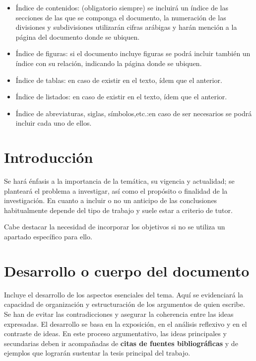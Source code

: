 \begin{itemize}
    \item Índice de contenidos: (obligatorio  siempre)  se  incluirá  un  índice  de  las secciones  de  las  que  se  componga  el  documento,  la  numeración  de las divisiones  y  subdivisiones  utilizarán  cifras  arábigas y harán mención a la página del documento donde se ubiquen.
    
\item Índice de figuras: si el documento incluye figuras se podrá incluir también un índice con su relación, indicando la página donde se ubiquen.

\item Índice de tablas: en caso de existir en el texto, ídem que el anterior.

\item Índice de listados: en caso de existir en el texto, ídem que el anterior.

\item Índice de abreviaturas, siglas, símbolos,etc.:en  caso  de  ser  necesarios  se podrá incluir cada uno de ellos.

\end{itemize}

 \section{Introducción}
Se hará énfasis a la importancia de la temática, su vigencia y  actualidad;  se  planteará  el  problema  a  investigar,  así  como  el  propósito  o finalidad de la investigación. En cuanto a incluir o no un anticipo de las conclusiones habitualmente depende del tipo de trabajo y suele estar a criterio de tutor.

Cabe destacar la necesidad de incorporar los objetivos si no se utiliza un apartado específico para ello.

 \section{Desarrollo o cuerpo del documento}
Incluye   el  desarrollo  de  los  aspectos  esenciales  del  tema.  Aquí  se  evidenciará la capacidad de organización y estructuración de los argumentos de quien escribe. Se han de evitar las contradicciones y asegurar la coherencia entre las ideas expresadas. El desarrollo se  basa  en  la  exposición,  en  el  análisis  reflexivo  y  en  el  contraste  de  ideas.  En  este  proceso  argumentativo,  las  ideas  principales  y  secundarias  deben  ir  acompañadas  de  \textbf{citas  de  fuentes  bibliográficas} y de ejemplos que lograrán sustentar la tesis principal del trabajo. 

